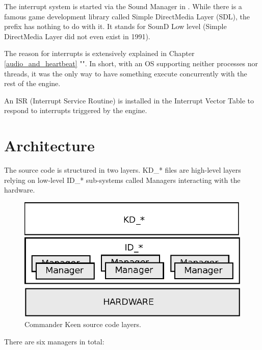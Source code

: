 \documentclass[book.tex]{subfiles}
\begin{document}
The interrupt system is started via the Sound Manager in . While there is a famous game development library called Simple DirectMedia Layer (SDL), the prefix  has nothing to do with it. It stands for SounD Low level (Simple DirectMedia Layer did not even exist in 1991).\\
\par
The reason for interrupts is extensively explained in Chapter \ref{audio_and_heartbeat} "". In short, with an OS supporting neither processes nor threads, it was the only way to have something execute concurrently with the rest of the engine.\\
\par
An ISR (Interrupt Service Routine) is installed in the Interrupt Vector Table to respond to interrupts triggered by the engine. \\
\par
\begin{minipage}{\textwidth}

\end{minipage}
\par



\pagebreak
\section{Architecture}

The source code is structured in two layers. KD\_* files are high-level layers relying on low-level ID\_* sub-systems called Managers interacting with the hardware.\\
\par
\begin{figure}[H]
\centering
\includegraphics[width=\textwidth]{imgs/drawings/layers.eps} 
\caption{Commander Keen source code layers.}
 \end{figure}
 \par
There are six managers in total:\\
\end{document}
